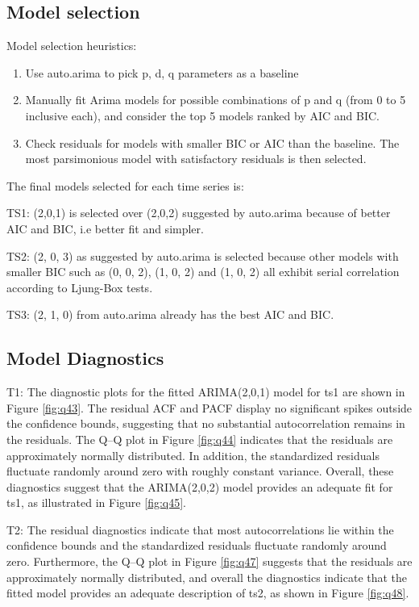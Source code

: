 \documentclass[
]{article}
\providecommand{\tightlist}{%
  \setlength{\itemsep}{0pt}\setlength{\parskip}{0pt}}
\theoremstyle{plain}
\theoremstyle{definition}
\theoremstyle{remark}
\begin{document}
\subsection{Model selection}\label{model-selection}

Model selection heuristics:

\begin{enumerate}
\def\labelenumi{\arabic{enumi}.}
\tightlist
\item
  Use auto.arima to pick p, d, q parameters as a baseline
\item
  Manually fit Arima models for possible combinations of p and q (from 0 to 5 inclusive each), and consider the top 5 models ranked by AIC and BIC.
\item
  Check residuals for models with smaller BIC or AIC than the baseline. The most parsimonious model with satisfactory residuals is then selected.
\end{enumerate}

The final models selected for each time series is:

TS1: (2,0,1) is selected over (2,0,2) suggested by auto.arima because of better AIC and BIC, i.e better fit and simpler.

TS2: (2, 0, 3) as suggested by auto.arima is selected because other models with smaller BIC such as (0, 0, 2), (1, 0, 2) and (1, 0, 2) all exhibit serial correlation according to Ljung-Box tests.

TS3: (2, 1, 0) from auto.arima already has the best AIC and BIC.

\subsection{Model Diagnostics}\label{model-diagnostics}

T1: The diagnostic plots for the fitted ARIMA(2,0,1) model for ts1 are shown in Figure \ref{fig:q43}. The residual ACF and PACF display no significant spikes outside the confidence bounds, suggesting that no substantial autocorrelation remains in the residuals. The Q--Q plot in Figure \ref{fig:q44} indicates that the residuals are approximately normally distributed. In addition, the standardized residuals fluctuate randomly around zero with roughly constant variance. Overall, these diagnostics suggest that the ARIMA(2,0,2) model provides an adequate fit for ts1, as illustrated in Figure \ref{fig:q45}.

T2: The residual diagnostics indicate that most autocorrelations lie within the confidence bounds and the standardized residuals fluctuate randomly around zero. Furthermore, the Q--Q plot in Figure \ref{fig:q47} suggests that the residuals are approximately normally distributed, and overall the diagnostics indicate that the fitted model provides an adequate description of ts2, as shown in Figure \ref{fig:q48}.
\end{document}

